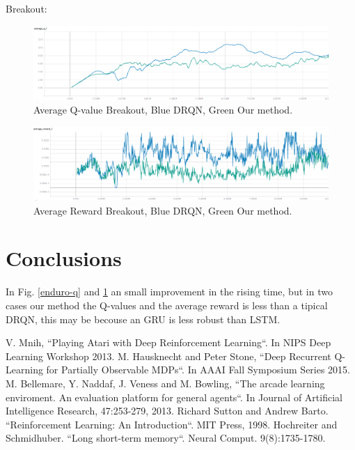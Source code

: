 \documentclass[conference]{IEEEtran}
\begin{document}
Breakout:

\begin{figure}[htbp]
\centerline{\includegraphics[width=\linewidth]{images/breakout-avQ-drqb-bl-dgruqn-gr.png}}
\caption{Average Q-value Breakout, Blue DRQN, Green Our method.}
\label{breakout-q}
\end{figure}

\begin{figure}[htbp]
\centerline{\includegraphics[width=\linewidth]{images/breakout-av-rew-drqn-bl-dgruqn-gr.png}}
\caption{Average Reward Breakout, Blue DRQN, Green Our method.}
\label{breakout-r}
\end{figure}

\section{Conclusions}

In Fig. \ref{enduro-q} and \ref{breakout-q} an small  improvement in the rising time, but in two cases our method the Q-values and the average reward is less than a tipical DRQN, this may be becouse an GRU is less robust than LSTM.



\begin{thebibliography}{00}
 V. Mnih, ``Playing Atari with Deep Reinforcement Learning``. In NIPS Deep Learning Workshop 2013.
 M. Hausknecht and Peter Stone, ``Deep Recurrent Q-Learning for Partially Observable MDPs``. In AAAI Fall Symposium Series 2015.
 M. Bellemare, Y. Naddaf, J. Veness and M. Bowling, ``The arcade learning enviroment. An evaluation platform for general agents``. In Journal of Artificial Intelligence Research, 47:253-279, 2013.
 Richard Sutton and Andrew Barto. ``Reinforcement Learning: An Introduction``. MIT Press, 1998.
 Hochreiter and Schmidhuber. ``Long short-term memory``. Neural Comput. 9(8):1735-1780.
\end{thebibliography}
\end{document}
